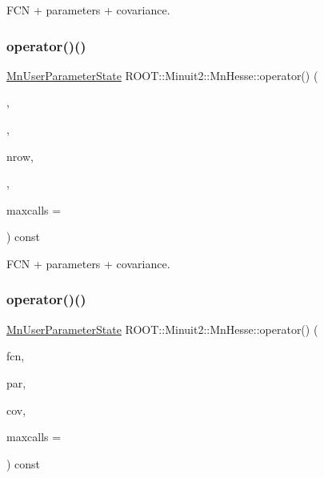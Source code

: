 F\+CN + parameters + covariance. 

\mbox{\label{classROOT_1_1Minuit2_1_1MnHesse_aa02f8d7bd10ea245658c9c1b3e296a45}} 
\subsubsection{\texorpdfstring{operator()()}{operator()()}\hspace{0.1cm}{\footnotesize\ttfamily [4/16]}}
{\footnotesize\ttfamily \mbox{\hyperlink{classROOT_1_1Minuit2_1_1MnUserParameterState}{Mn\+User\+Parameter\+State}} R\+O\+O\+T\+::\+Minuit2\+::\+Mn\+Hesse\+::operator() (\begin{DoxyParamCaption}\item[{const \mbox{\hyperlink{classROOT_1_1Minuit2_1_1FCNBase}{F\+C\+N\+Base}} \&}]{,  }\item[{const std\+::vector$<$ double $>$ \&}]{,  }\item[{unsigned int}]{nrow,  }\item[{const std\+::vector$<$ double $>$ \&}]{,  }\item[{unsigned int}]{maxcalls = {} }\end{DoxyParamCaption}) const}



F\+CN + parameters + covariance. 

\mbox{\label{classROOT_1_1Minuit2_1_1MnHesse_a5d575c4f72e0024578b07579a7e3a4a3}} 
\subsubsection{\texorpdfstring{operator()()}{operator()()}\hspace{0.1cm}{\footnotesize\ttfamily [5/16]}}
{\footnotesize\ttfamily \mbox{\hyperlink{classROOT_1_1Minuit2_1_1MnUserParameterState}{Mn\+User\+Parameter\+State}} R\+O\+O\+T\+::\+Minuit2\+::\+Mn\+Hesse\+::operator() (\begin{DoxyParamCaption}\item[{const \mbox{\hyperlink{classROOT_1_1Minuit2_1_1FCNBase}{F\+C\+N\+Base}} \&}]{fcn,  }\item[{const std\+::vector$<$ double $>$ \&}]{par,  }\item[{const \mbox{\hyperlink{classROOT_1_1Minuit2_1_1MnUserCovariance}{Mn\+User\+Covariance}} \&}]{cov,  }\item[{unsigned int}]{maxcalls = {} }\end{DoxyParamCaption}) const}




